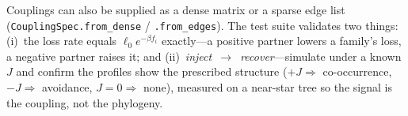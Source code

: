 \documentclass[11pt]{article}
\begin{document}
\noindent
Couplings can also be supplied as a dense matrix or a sparse edge list
(\texttt{CouplingSpec.from\_dense} / \texttt{.from\_edges}). The test suite validates two
things:
(i)~the loss rate equals $\ell_0 e^{-\beta f_i}$ exactly---a positive partner lowers a
family's loss, a negative partner raises it; and (ii)~\emph{inject~$\to$~recover}---simulate
under a known $J$ and confirm the profiles show the prescribed structure ($+J\Rightarrow$
co-occurrence, $-J\Rightarrow$ avoidance, $J=0\Rightarrow$ none), measured on a near-star
tree so the signal is the coupling, not the phylogeny.
\end{document}
